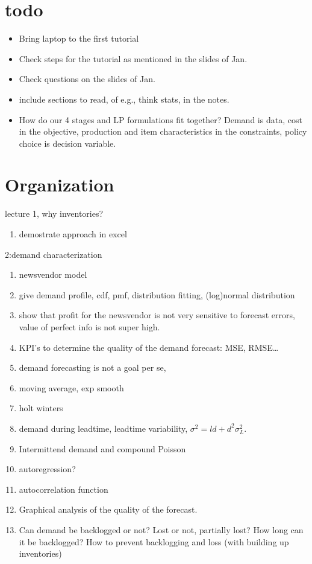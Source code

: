 
\section{todo}
\label{sec:todo}

\begin{itemize}
\item Bring laptop to the first tutorial
\item Check steps for the tutorial as mentioned in the slides of Jan.
\item Check questions on the slides of Jan.
\item include sections to read, of e.g., think stats, in the notes.
\item How do our 4 stages and LP formulations fit together? Demand is
  data, cost in the objective, production and item characteristics in
  the constraints, policy choice is decision variable.
\end{itemize}



\section{Organization}
\label{sec:organization}


lecture 1, why inventories?

\begin{enumerate}
\item demostrate approach in excel
\end{enumerate}

2:demand characterization
\begin{enumerate}
\item newsvendor model
\item give demand profile, cdf, pmf, distribution fitting, (log)normal distribution
\item show that profit for the newsvendor is not very sensitive to
  forecast errors, value of perfect info is not super high. 
\item KPI's to determine the quality of the demand forecast: MSE, RMSE\ldots
\item demand forecasting is not a goal per se,
\item moving average, exp smooth
\item holt winters
\item demand during leadtime, leadtime variability, $\sigma^2 = l d + d^2 \sigma_L^2$.
\item Intermittend demand and compound Poisson
\item autoregression?
\item autocorrelation function
\item Graphical analysis of the quality of the forecast.
\item Can demand be backlogged or not? Lost or not, partially lost?
  How long can it be backlogged? How to prevent backlogging and loss
  (with building up inventories)
\end{enumerate}

